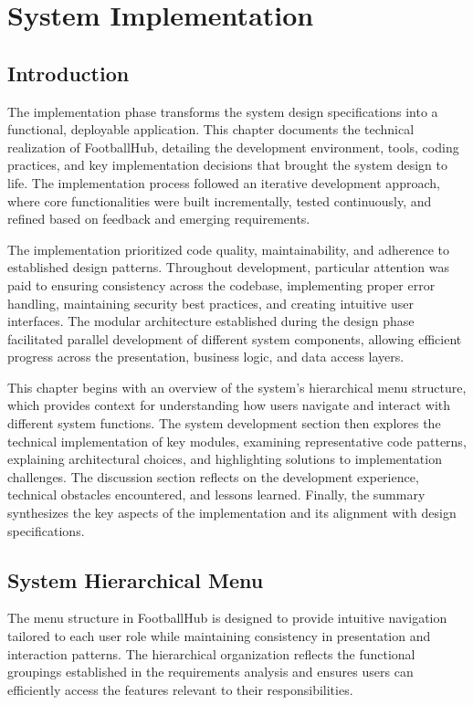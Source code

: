 \chapter{System Implementation}
\thispagestyle{empty}
\label{ch:6}

\section{Introduction}

The implementation phase transforms the system design specifications into a functional, deployable application. This chapter documents the technical realization of FootballHub, detailing the development environment, tools, coding practices, and key implementation decisions that brought the system design to life. The implementation process followed an iterative development approach, where core functionalities were built incrementally, tested continuously, and refined based on feedback and emerging requirements.

The implementation prioritized code quality, maintainability, and adherence to established design patterns. Throughout development, particular attention was paid to ensuring consistency across the codebase, implementing proper error handling, maintaining security best practices, and creating intuitive user interfaces. The modular architecture established during the design phase facilitated parallel development of different system components, allowing efficient progress across the presentation, business logic, and data access layers.

This chapter begins with an overview of the system's hierarchical menu structure, which provides context for understanding how users navigate and interact with different system functions. The system development section then explores the technical implementation of key modules, examining representative code patterns, explaining architectural choices, and highlighting solutions to implementation challenges. The discussion section reflects on the development experience, technical obstacles encountered, and lessons learned. Finally, the summary synthesizes the key aspects of the implementation and its alignment with design specifications.

\section{System Hierarchical Menu}

The menu structure in FootballHub is designed to provide intuitive navigation tailored to each user role while maintaining consistency in presentation and interaction patterns. The hierarchical organization reflects the functional groupings established in the requirements analysis and ensures users can efficiently access the features relevant to their responsibilities.

